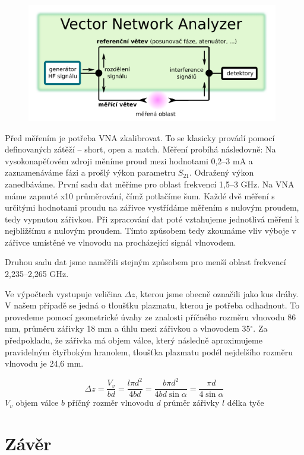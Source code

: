 \documentclass[a4paper,12pt]{article}
\begin{document}
\begin{figure}[h]
	\centering
	\includegraphics[width=110mm]{vna.png}
	\caption{}
	\label{vna}
\end{figure}

Před měřením je potřeba VNA zkalibrovat. To se klasicky provádí pomocí definovaných
zátěží -- short, open a match. Měření probíhá následovně: Na vysokonapěťovém zdroji
měníme proud mezi hodnotami 0,2--3 \si{\milli\ampere} a zaznamenáváme fázi a prošlý
výkon parametru $S_{21}$. Odražený výkon zanedbáváme. První sadu dat měříme pro oblast
frekvencí 1,5--3 \si{\giga\hertz}. Na VNA máme zapnuté x10 průměrování, čímž potlačíme
šum. Každé dvě měření s určitými hodnotami proudu na zářivce vystřídáme měřením s
nulovým proudem, tedy vypnutou zářivkou. Při zpracování dat poté vztahujeme jednotlivá
měření k nejbližšímu s nulovým proudem. Tímto způsobem tedy zkoumáme vliv výboje v zářivce umístěné ve vlnovodu na procházející signál vlnovodem.

Druhou sadu dat jsme naměřili stejným způsobem pro menší oblast frekvencí 2,235--2,265 \si{\giga\hertz}.

Ve výpočtech vystupuje veličina $\Delta z$, kterou jsme obecně označili jako kus dráhy.
V našem případě se jedná o tloušťku plazmatu, kterou je potřeba odhadnout. To provedeme
pomocí geometrické úvahy ze znalosti příčného rozměru vlnovodu 86 \si{\milli\meter},
průměru zářivky 18 \si{\milli\meter} a úhlu mezi zářivkou a vlnovodem 35$^{\circ}$. Za
předpokladu, že zářivka má objem válce, který následně aproximujeme pravidelným
čtyřbokým hranolem, tloušťka plazmatu podél nejdelšího rozměru vlnovodu je 24,6 
\si{\milli\meter}.

\begin{equation}
	\Delta z = \frac{V_v}{bd} = \frac{l \pi d^2}{4bd} = \frac{b \pi 
	d^2}{4bd\sin\alpha} = \frac{\pi d}{4\sin\alpha}
\end{equation}
$V_v$ objem válce
$b$ příčný rozměr vlnovodu
$d$ průměr zářivky
$l$ délka tyče


\section{Závěr}
\end{document}

